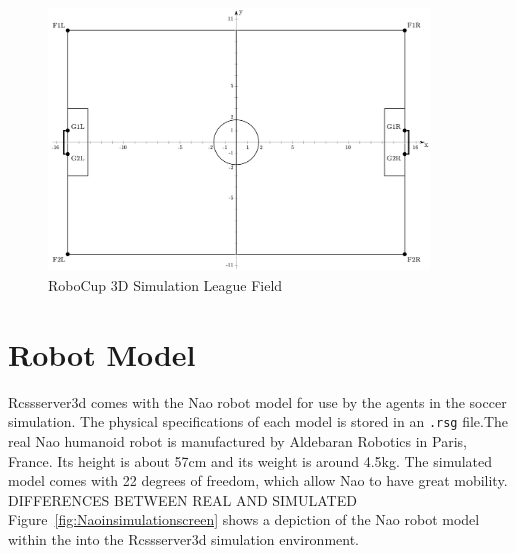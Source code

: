 \begin{figure}[t!]
\centering
  \includegraphics[width=0.9\textwidth]{Chapter2/figures/SoccerSimulation_FieldPlan.png}
  \caption{RoboCup 3D Simulation League Field} 
  \label{fig:SimulationSoccerField}
\end{figure}


\section{Robot Model}
Rcssserver3d comes with the Nao robot model for use by the agents in the soccer simulation. The physical specifications of each model is stored in an \texttt{.rsg} file.The real Nao humanoid robot is manufactured by Aldebaran Robotics in Paris, France. Its height is about 57cm and its weight is around 4.5kg. The simulated model comes with 22 degrees of freedom, which allow Nao to have great mobility. DIFFERENCES BETWEEN REAL AND SIMULATED Figure~\ref{fig:Naoinsimulationscreen} shows a depiction of the Nao robot model within the into the Rcssserver3d simulation environment.

